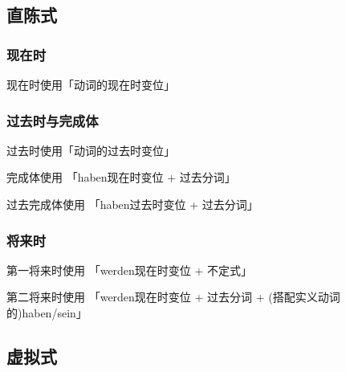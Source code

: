 \begin{table}[htbp]
\begin{tblr}
\end{tblr}
\end{table}

\subsection{直陈式}

\subsubsection{现在时}

现在时使用「动词的现在时变位」

\subsubsection{过去时与完成体}

过去时使用「动词的过去时变位」

完成体使用 「haben现在时变位 + 过去分词」

过去完成体使用 「haben过去时变位 + 过去分词」

\subsubsection{将来时}

第一将来时使用 「werden现在时变位 + 不定式」

第二将来时使用 「werden现在时变位 + 过去分词 + (搭配实义动词的)haben/sein」

\subsection{虚拟式}


